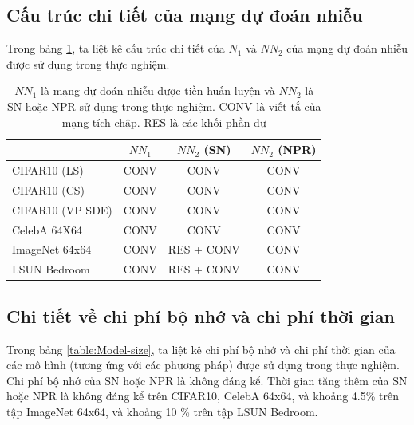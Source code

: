 \documentclass[14pt, a4paper]{article}
\numberwithin{equation}{section}
\numberwithin{figure}{section}
\numberwithin{dl}{section}
\numberwithin{md}{section}
\numberwithin{bd}{section}
\numberwithin{dn}{section}
\numberwithin{hq}{section}
\begin{document}
    \subsection{Cấu trúc chi tiết của mạng dự đoán nhiễu}

    Trong bảng \ref{table:Structures-Details-of-Prediction-Network}, ta liệt kê cấu trúc chi tiết của $N_1$ và $NN_2$ của mạng dự đoán nhiễu được sử dụng trong thực nghiệm.

    \begin{table}[h!] 
        \caption{$NN_1$ là mạng dự đoán nhiễu được tiền huấn luyện và $NN_2$ là SN hoặc NPR sử dụng trong thực nghiệm.
        CONV là viết tắ của mạng tích chập. RES là các khối phần dư}
        \begin{center}
            \begin{tabular}{l c c c }
                \hline
                & $NN_1$ & $NN_2$ (SN) & $NN_2$ (NPR) \\
                \hline
                CIFAR10 (LS) & CONV & CONV & CONV \\
                CIFAR10 (CS) & CONV & CONV & CONV \\
                CIFAR10 (VP SDE) & CONV & CONV & CONV \\
                CelebA 64X64 & CONV & CONV & CONV \\
                ImageNet 64x64 & CONV & RES + CONV & CONV \\
                LSUN Bedroom & CONV & RES + CONV & CONV \\
                \hline
            \end{tabular}
        \end{center}
        \label{table:Structures-Details-of-Prediction-Network}
    \end{table}

    \subsection{Chi tiết về chi phí bộ nhớ và chi phí thời gian} \label{Appen:Subsection:Details-of-Memory-and-Time-Cost}

    Trong bảng \ref{table:Model-size}, ta liệt kê chi phí bộ nhớ và chi phí thời gian của các mô hình (tương ứng với các phương pháp) được sử dụng trong thực nghiệm.
    Chi phí bộ nhớ của SN hoặc NPR là không đáng kể. Thời gian tăng thêm của SN hoặc NPR là không đáng kể trên CIFAR10, CelebA 64x64, và khoảng 4.5\% trên tập ImageNet 64x64, và khoảng 10 \% trên tập LSUN Bedroom.
\end{document}
